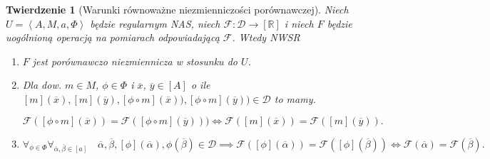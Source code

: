 \documentclass[12pt,a4paper]{report}
\newtheorem{tw}[definition]{Twierdzenie}
\newcommand{\domkniecie}[1]{\left\lbrack{#1}\right\rbrack}
\newcommand{\tuple}[1]{\left\langle {#1} \right\rangle}
\begin{document}
\begin{tw}[Warunki równoważne niezmienniczości porównawczej]
Niech $U=\tuple{A,M,a,\Phi}$ będzie regularnym NAS, niech $\mathcal{F}:\mathcal{D}\to \domkniecie{\mathbb{R}}$ i niech $F$ będzie uogólnioną operacją na pomiarach odpowiadającą $\mathcal{F}$. Wtedy
NWSR
\begin{enumerate}
\item
$F$ jest porównawczo niezmiennicza w stosunku do $U$.
\item
Dla dow. $m \in M$, $\phi \in \Phi$ i $\overline{x}$, $\overline{y} \in \domkniecie{A}$ o ile $\domkniecie{m}(\overline{x}), \domkniecie{
m}(\overline{y}), \domkniecie{\phi\circ m}(\overline{x})), \domkniecie{\phi\circ m}(\overline{y})) \in \mathcal{D}$ to mamy.

$$
\mathcal{F}(\domkniecie{\phi \circ m}(\overline{x}))=\mathcal{F}(\domkniecie{\phi \circ m}(\overline{y}))) \iff \mathcal{F}(\domkniecie{m}(\overline{x}))=\mathcal{F}(\domkniecie{m}(\overline{y})).
$$
\item
$$
\forall_{\phi \in \Phi} \forall_{\overline{\alpha}, \overline{\beta} \in \domkniecie{a}}  \quad \overline{\alpha}, \overline{\beta}, \domkniecie{\phi}(\overline{\alpha}), \phi(\overline{\beta}) \in \mathcal{D} \implies  \mathcal{F}(\domkniecie{\phi}(\overline{\alpha}))=\mathcal{F}(\domkniecie{\phi}(\overline{\beta})) \iff \mathcal{F}(\overline{\alpha})=\mathcal{F}(\overline{\beta}).
$$
\end{enumerate}

\end{tw}
\end{document}
